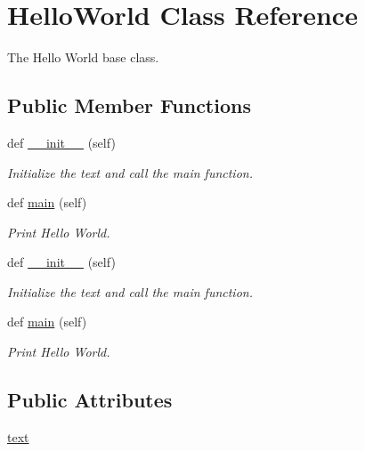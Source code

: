 \hypertarget{classpipver_1_1helloworld_1_1HelloWorld}{}\section{Hello\+World Class Reference}
\label{classpipver_1_1helloworld_1_1HelloWorld}


The Hello World base class.  


\subsection*{Public Member Functions}
\begin{DoxyCompactItemize}
\item 
def \hyperlink{classpipver_1_1helloworld_1_1HelloWorld_ae64f0875afe3067b97ba370b354b9213}{\+\_\+\+\_\+init\+\_\+\+\_\+} (self)
\begin{DoxyCompactList}\small\item\em Initialize the text and call the main function. \end{DoxyCompactList}\item 
def \hyperlink{classpipver_1_1helloworld_1_1HelloWorld_a7e1501a70203cec5b3c885a2c87ae98c}{main} (self)
\begin{DoxyCompactList}\small\item\em Print Hello World. \end{DoxyCompactList}\item 
def \hyperlink{classpipver_1_1helloworld_1_1HelloWorld_ae64f0875afe3067b97ba370b354b9213}{\+\_\+\+\_\+init\+\_\+\+\_\+} (self)
\begin{DoxyCompactList}\small\item\em Initialize the text and call the main function. \end{DoxyCompactList}\item 
def \hyperlink{classpipver_1_1helloworld_1_1HelloWorld_a7e1501a70203cec5b3c885a2c87ae98c}{main} (self)
\begin{DoxyCompactList}\small\item\em Print Hello World. \end{DoxyCompactList}\end{DoxyCompactItemize}
\subsection*{Public Attributes}
\begin{DoxyCompactItemize}
\item 
\hyperlink{classpipver_1_1helloworld_1_1HelloWorld_af575f17e6be3f269b86b041a60560dbf}{text}
\end{DoxyCompactItemize}


